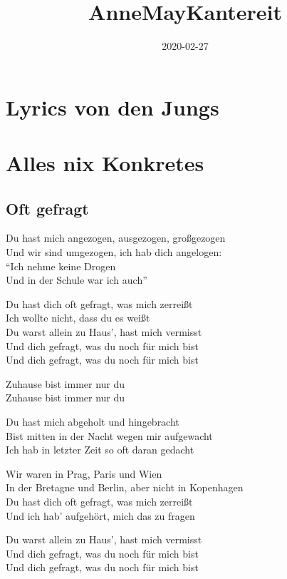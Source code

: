 \documentclass[]{book}
\title{AnneMayKantereit}
\author{}
\date{2020-02-27}
\begin{document}
\maketitle

{
\setcounter{tocdepth}{1}
\tableofcontents
}
\hypertarget{lyrics-von-den-jungs}{%
\chapter{Lyrics von den Jungs}\label{lyrics-von-den-jungs}}

\hypertarget{alles-nix-konkretes}{%
\chapter{Alles nix Konkretes}\label{alles-nix-konkretes}}

\hypertarget{oft-gefragt}{%
\section{Oft gefragt}\label{oft-gefragt}}

Du hast mich angezogen, ausgezogen, großgezogen\\
Und wir sind umgezogen, ich hab dich angelogen:\\
``Ich nehme keine Drogen\\
Und in der Schule war ich auch''

Du hast dich oft gefragt, was mich zerreißt\\
Ich wollte nicht, dass du es weißt\\
Du warst allein zu Haus', hast mich vermisst\\
Und dich gefragt, was du noch für mich bist\\
Und dich gefragt, was du noch für mich bist

Zuhause bist immer nur du\\
Zuhause bist immer nur du

Du hast mich abgeholt und hingebracht\\
Bist mitten in der Nacht wegen mir aufgewacht\\
Ich hab in letzter Zeit so oft daran gedacht

Wir waren in Prag, Paris und Wien\\
In der Bretagne und Berlin, aber nicht in Kopenhagen\\
Du hast dich oft gefragt, was mich zerreißt\\
Und ich hab' aufgehört, mich das zu fragen

Du warst allein zu Haus', hast mich vermisst\\
Und dich gefragt, was du noch für mich bist\\
Und dich gefragt, was du noch für mich bist
\end{document}

